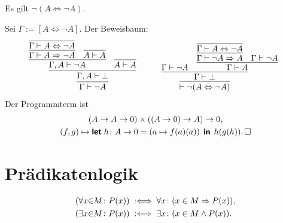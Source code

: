 \begin{Satz}\label{non-eq-prop-neg}
Es gilt $\neg (A\Leftrightarrow\neg A)$.
\end{Satz}
\begin{Beweis}
Sei $\Gamma:=[A\Leftrightarrow\neg A]$. Der Beweisbaum:
\[
\begin{array}{@{}l@{\qquad\quad}l}
\infer{\Gamma\vdash\neg A}{
  \infer{\Gamma,A\vdash\bot}{
    \infer{\Gamma,A\vdash\neg A}{
      \infer{\Gamma\vdash A\Rightarrow\neg A}{
        \infer{\Gamma\vdash A\Leftrightarrow\neg A}{}}
    & \infer{A\vdash A}{}}
  & \infer{A\vdash A}{}}}
&
\infer{\vdash\neg (A\Leftrightarrow\neg A)}{
  \infer{\Gamma\vdash\bot}{
    \Gamma\vdash\neg A
  & \infer{\Gamma\vdash A}{
      \infer{\Gamma\vdash\neg A\Rightarrow A}{
        \infer{\Gamma\vdash A\Leftrightarrow\neg A}{}}
    & \Gamma\vdash\neg A}}}
\end{array}
\]
Der Programmterm ist
\begin{gather*}
(A\to A\to 0)\times ((A\to 0)\to A)\to 0,\\
(f,g)\mapsto\text{{\normalfont\sffamily\bfseries let}}\; h\colon A\to 0 = (a\mapsto f(a)(a))
\;\,\text{{\normalfont\sffamily\bfseries in}}\;\, h(g(h)).\,\square
\end{gather*}
\end{Beweis}

\newpage
\section{Prädikatenlogik}

\begin{Definition}%
\label{def:bounded}
\begin{align}
(\forall x{\in}M\colon P(x)) &\;:\Longleftrightarrow\; \forall x\colon (x\in M\Rightarrow P(x)),\\
(\exists x{\in}M\colon P(x)) &\;:\Longleftrightarrow\; \exists x\colon (x\in M\land P(x)).
\end{align}
\end{Definition}

